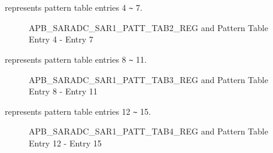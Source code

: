 \documentclass[main\_\_EN.tex]{subfiles}
\begin{document}
%
%
%
%
%
\begin{regdesc}\begin{reglist}
\item [cmd \regindex{n} (\regindex{n} = 4 - 7)] represents pattern table entries 4 \verb+~+ 7.
\end{reglist}\end{regdesc}
\vspace{-2em}
\begin{figure}[H]
    \centering
    \caption{APB\_SARADC\_SAR1\_PATT\_TAB2\_REG and Pattern Table Entry 4 - Entry 7}
    \label{fig:pattern-tab-2}
\end{figure}

%
%
%
%
%
\begin{regdesc}\begin{reglist}
\item [cmd \regindex{n} (\regindex{n} = 8 - 11)] represents pattern table entries 8 \verb+~+ 11.
\end{reglist}\end{regdesc}
\vspace{-2em}
\begin{figure}[H]
    \centering
    \caption{APB\_SARADC\_SAR1\_PATT\_TAB3\_REG and Pattern Table Entry 8 - Entry 11}
    \label{fig:pattern-tab-3}
\end{figure}

%
%
%
%
%
\begin{regdesc}\begin{reglist}
\item [cmd \regindex{n} (\regindex{n} = 12 - 15)] represents pattern table entries 12 \verb+~+ 15.
\end{reglist}\end{regdesc}
\vspace{-2em}
\begin{figure}[H]
    \centering
    \caption{APB\_SARADC\_SAR1\_PATT\_TAB4\_REG and Pattern Table Entry 12 - Entry 15}
    \label{fig:pattern-tab-4}
\end{figure}
\end{document}
